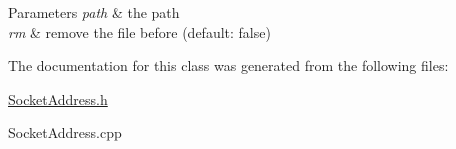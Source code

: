 \begin{DoxyParams}{Parameters}
{\em path} & the path \\
\hline
{\em rm} & remove the file before (default\-: false) \\
\hline
\end{DoxyParams}


The documentation for this class was generated from the following files\-:\begin{DoxyCompactItemize}
\item 
\hyperlink{a00141}{Socket\-Address.\-h}\item 
Socket\-Address.\-cpp\end{DoxyCompactItemize}
